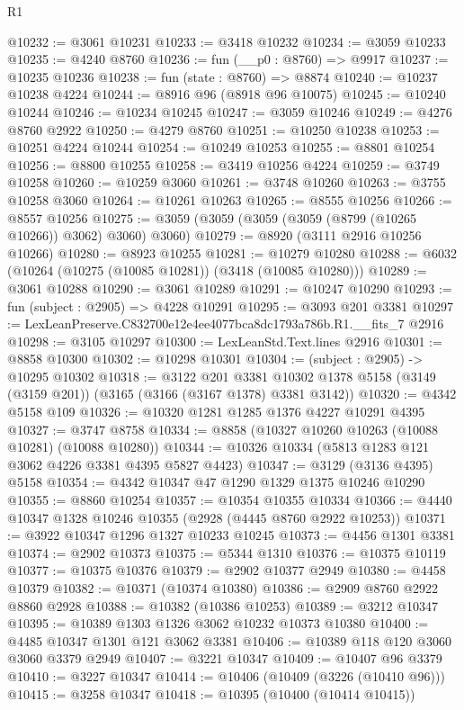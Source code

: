 \begin{lexlean}{R1}
\begin{coremodule}
@10232 := @3061 @10231
@10233 := @3418 @10232
@10234 := @3059 @10233
@10235 := @4240 @8760
@10236 := fun (__p0 : @8760) => @9917
@10237 := @10235 @10236
@10238 := fun (state : @8760) => @8874
@10240 := @10237 @10238 @4224
@10244 := @8916 @96 (@8918 @96 @10075)
@10245 := @10240 @10244
@10246 := @10234 @10245
@10247 := @3059 @10246
@10249 := @4276 @8760 @2922
@10250 := @4279 @8760
@10251 := @10250 @10238
@10253 := @10251 @4224 @10244
@10254 := @10249 @10253
@10255 := @8801 @10254
@10256 := @8800 @10255
@10258 := @3419 @10256 @4224
@10259 := @3749 @10258
@10260 := @10259 @3060
@10261 := @3748 @10260
@10263 := @3755 @10258 @3060
@10264 := @10261 @10263
@10265 := @8555 @10256
@10266 := @8557 @10256
@10275 := @3059 (@3059 (@3059 (@3059 (@8799 (@10265 @10266)) @3062) @3060) @3060)
@10279 := @8920 (@3111 @2916 @10256 @10266)
@10280 := @8923 @10255
@10281 := @10279 @10280
@10288 := @6032 (@10264 (@10275 (@10085 @10281)) (@3418 (@10085 @10280)))
@10289 := @3061 @10288
@10290 := @3061 @10289
@10291 := @10247 @10290
@10293 := fun (subject : @2905) => @4228 @10291
@10295 := @3093 @201 @3381
@10297 := LexLeanPreserve.C832700e12e4ee4077bca8dc1793a786b.R1.__fits_7 @2916
@10298 := @3105 @10297
@10300 := LexLeanStd.Text.lines @2916
@10301 := @8858 @10300
@10302 := @10298 @10301
@10304 := (subject : @2905) -> @10295 @10302
@10318 := @3122
    @201
    @3381
    @10302
    @1378
    @5158
    (@3149 (@3159 @201))
    (@3165 (@3166 (@3167 @1378) @3381 @3142))
@10320 := @4342 @5158 @109
@10326 := @10320 @1281 @1285 @1376 @4227 @10291 @4395
@10327 := @3747 @8758
@10334 := @8858 (@10327 @10260 @10263 (@10088 @10281) (@10088 @10280))
@10344 := @10326 @10334 (@5813 @1283 @121 @3062 @4226 @3381 @4395 @5827 @4423)
@10347 := @3129 (@3136 @4395) @5158
@10354 := @4342 @10347 @47 @1290 @1329 @1375 @10246 @10290
@10355 := @8860 @10254
@10357 := @10354 @10355 @10334
@10366 := @4440 @10347 @1328 @10246 @10355 (@2928 (@4445 @8760 @2922 @10253))
@10371 := @3922 @10347 @1296 @1327 @10233 @10245
@10373 := @4456 @1301 @3381
@10374 := @2902 @10373
@10375 := @5344 @1310
@10376 := @10375 @10119
@10377 := @10375 @10376
@10379 := @2902 @10377 @2949
@10380 := @4458 @10379
@10382 := @10371 (@10374 @10380)
@10386 := @2909 @8760 @2922 @8860 @2928
@10388 := @10382 (@10386 @10253)
@10389 := @3212 @10347
@10395 := @10389 @1303 @1326 @3062 @10232 @10373 @10380
@10400 := @4485 @10347 @1301 @121 @3062 @3381
@10406 := @10389 @118 @120 @3060 @3060 @3379 @2949
@10407 := @3221 @10347
@10409 := @10407 @96 @3379
@10410 := @3227 @10347
@10414 := @10406 (@10409 (@3226 (@10410 @96)))
@10415 := @3258 @10347
@10418 := @10395 (@10400 (@10414 @10415))

\end{coremodule}
\end{lexlean}
